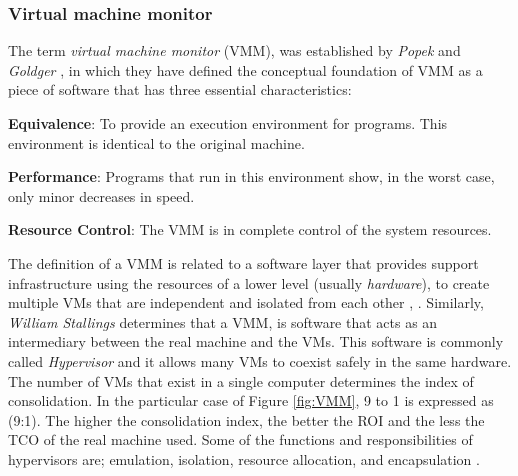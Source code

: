 	
	\subsubsection{Virtual machine monitor}
	
	The term \textit{virtual machine monitor} (VMM), was established by \textit{Popek} and \textit{Goldger} \cite{Popek1974}, in which they have defined the conceptual foundation of VMM as a piece of software that has three essential characteristics:
	
%		

    \textbf{Equivalence}: To provide an execution environment for programs. This environment is identical to the original machine.
	
	\textbf{Performance}: Programs that run in this environment show, in the worst case, only minor decreases in speed.

    \textbf{Resource Control}: The VMM is in complete control of the system resources.

	The definition of a VMM is related to a software layer that provides support infrastructure using the resources of a lower level (usually \textit{hardware}), to create multiple VMs that are independent and isolated from each other \cite{Chiueh2005}, \cite{Cafaro2011}. Similarly, \textit{William Stallings} \cite{Stallings2015} determines that a VMM, is software that acts as an intermediary between the real machine and the VMs. 
	This software is commonly called \textit{Hypervisor} and it allows many VMs to coexist safely in the same hardware. The number of VMs that exist in a single computer determines the index of consolidation. In the particular case of Figure \ref{fig:VMM}, 9 to 1 is expressed as (9:1). The higher the consolidation index, the better the ROI and the less the TCO of the real machine used. Some of the functions and responsibilities of hypervisors are; emulation, isolation, resource allocation, and encapsulation \cite{Hoopes2009}.


